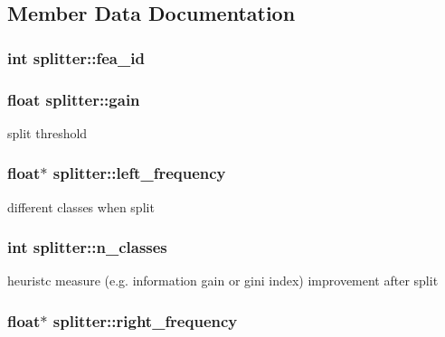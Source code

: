 \subsection{Member Data Documentation}
\hypertarget{classsplitter_ad093754efc111ae9dcb00e844b91e979}{
\subsubsection[{fea\+\_\+id}]{\setlength{\rightskip}{0pt plus 5cm}int splitter\+::fea\+\_\+id}}\label{classsplitter_ad093754efc111ae9dcb00e844b91e979}
\hypertarget{classsplitter_a4c49114e4256e0dca9ead72f3ecb5a74}{
\subsubsection[{gain}]{\setlength{\rightskip}{0pt plus 5cm}float splitter\+::gain}}\label{classsplitter_a4c49114e4256e0dca9ead72f3ecb5a74}
split threshold \hypertarget{classsplitter_a0a1c53a640e3305eeb32a9586fea657b}{
\subsubsection[{left\+\_\+frequency}]{\setlength{\rightskip}{0pt plus 5cm}float$\ast$ splitter\+::left\+\_\+frequency}}\label{classsplitter_a0a1c53a640e3305eeb32a9586fea657b}
different classes when split \hypertarget{classsplitter_abfc53538ed65c0afd50aedbf46dff458}{
\subsubsection[{n\+\_\+classes}]{\setlength{\rightskip}{0pt plus 5cm}int splitter\+::n\+\_\+classes}}\label{classsplitter_abfc53538ed65c0afd50aedbf46dff458}
heuristc measure (e.\+g. information gain or gini index) improvement after split \hypertarget{classsplitter_a8e1727de05ad39513dab201d6657aeed}{
\subsubsection[{right\+\_\+frequency}]{\setlength{\rightskip}{0pt plus 5cm}float$\ast$ splitter\+::right\+\_\+frequency}}\label{classsplitter_a8e1727de05ad39513dab201d6657aeed}

